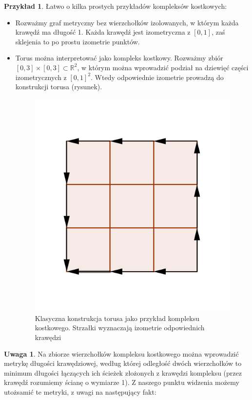 \documentclass[licencjacka]{pracamgr}
\theoremstyle{definition}
\theoremstyle{definition}
\newtheorem{remark}{Uwaga}[section]
\theoremstyle{definition}
\theoremstyle{definition}
\newtheorem{example}{Przykład}[section]
\theoremstyle{definition}
\theoremstyle{plain}
\theoremstyle{plain}
\begin{document}
\begin{example}
	Łatwo o kilka prostych przykładów kompleksów kostkowych:
	\begin{itemize}
	\item Rozważmy graf metryczny bez wierzchołków izolowanych, w którym każda krawędź ma 
	długość 1. Każda krawędź jest izometryczna z $ [0,1] $, zaś sklejenia to
	po prostu izometrie punktów.
	\item Torus można interpretować jako kompleks kostkowy. Rozważmy zbiór 
	$ [0,3]\times[0,3] \subset \mathbb{R}^2 $, w którym można wprowadzić podział 
	na dziewięć części izometrycznych z $ [0,1]^2 $. Wtedy odpowiednie izometrie 
	prowadzą do konstrukcji torusa (rysunek).
	\begin{figure}
	\caption{\small{Klasyczna konstrukcja torusa jako przykład kompleksu kostkowego. 
	Strzałki wyznaczają izometrie odpowiednich krawędzi}}
	\centering
	\includegraphics{torus}
	\end{figure}
	\end{itemize}
\end{example}


\begin{remark}
	Na zbiorze wierzchołków kompleksu kostkowego można wprowadzić metrykę 
	długości krawędziowej, według której 
	odległość dwóch wierzchołków to minimum długości łączących ich ścieżek złożonych 
	z krawędzi kompleksu (przez krawędź rozumiemy ścianę o wymiarze 1).
	Z naszego punktu widzenia możemy utożsamić te metryki, z uwagi na następujący fakt:
\end{remark}
\end{document}
